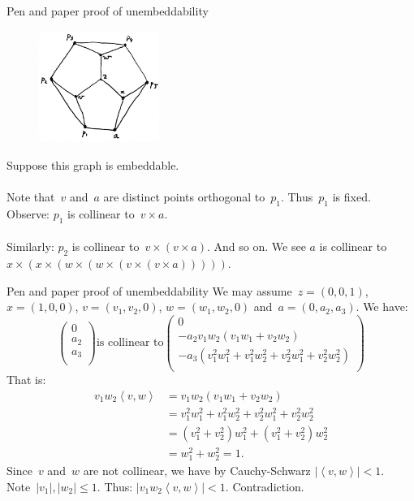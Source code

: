 \documentclass{beamer}
\begin{document}
\begin{frame}{Pen and paper proof of unembeddability}
    \begin{figure}
        \includegraphics[width=0.35\textwidth]{../graphs/unemb-10-2.jpg}
    \end{figure}
Suppose this graph is embeddable.
\\~\\

Note that~$v$ and~$a$ are distinct points orthogonal to~$p_1$.
Thus~$p_1$ is fixed.
Observe: $p_1$ is collinear to~$v \times a$.
\pause
\\~\\
Similarly: $p_2$ is collinear to~$v \times (v \times a)$.
And so on.  We see 
$a$ is collinear to $x \times (x \times (w \times (w \times (v \times
                    (v \times a)))))$.
\end{frame}

\begin{frame}{Pen and paper proof of unembeddability}
We may assume~$z=(0,0,1)$, $x=(1,0,0)$, $v=(v_1, v_2, 0)$, $w=(w_1,w_2,0)$
    and~$a=(0,a_2,a_3)$. We have:
\begin{equation*}
 \left(
\begin{smallmatrix}
0\\
a_2\\
a_3\\
\end{smallmatrix}
\right)
\text{is collinear to}
\left(
\begin{smallmatrix}
0\\
-a_2 v_1w_2 (v_1w_1 + v_2w_2) \\
-a_3 (v_1^2 w_1^2 + v_1^2 w_2^2 + v_2^2w_1^2 + v_2^2w_2^2)\\
\end{smallmatrix}
\right)
\end{equation*}
\pause
That is:
\begin{align*}
v_1w_2 \left<v,w\right> & =
v_1w_2 (v_1w_1 + v_2w_2) \\
& = v_1^2 w_1^2 + v_1^2 w_2^2 + v_2^2w_1^2 + v_2^2w_2^2 \\
& = (v_1^2 + v_2^2)w_1^2 + (v_1^2 + v_2^2)w_2^2 \\
& = w_1^2 + w_2^2 = 1.
\end{align*}
\pause
Since~$v$ and~$w$ are not collinear,
we have by Cauchy-Schwarz $|\left<v,w\right>| < 1$.
Note~$|v_1|, |w_2| \leq 1$.
Thus: $|v_1w_2\left<v,w\right>| < 1$.
Contradiction.
\end{frame}
\end{document}
